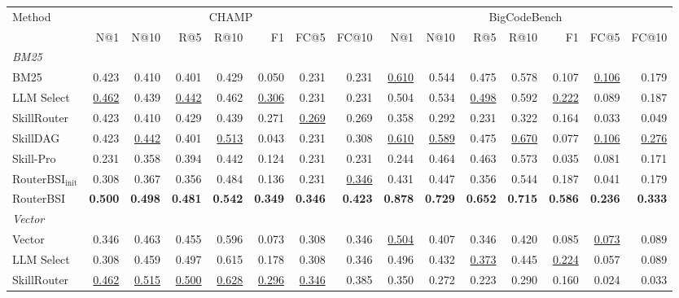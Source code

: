 \begin{table}[t]
\centering
\footnotesize
\setlength{\tabcolsep}{2pt}
\begin{tabular*}{\textwidth}{@{\extracolsep{\fill}}lrrrrrrrrrrrrrr@{}}
\toprule
Method & \multicolumn{7}{c}{CHAMP} & \multicolumn{7}{c}{BigCodeBench} \\
\cmidrule(lr){2-8}\cmidrule(lr){9-15}
 & N@1 & N@10 & R@5 & R@10 & F1 & FC@5 & FC@10 & N@1 & N@10 & R@5 & R@10 & F1 & FC@5 & FC@10 \\
\midrule
\multicolumn{15}{l}{\textit{BM25}} \\
\midrule
BM25 & 0.423 & 0.410 & 0.401 & 0.429 & 0.050 & 0.231 & 0.231 & \underline{0.610} & 0.544 & 0.475 & 0.578 & 0.107 & \underline{0.106} & 0.179 \\
LLM Select & \underline{0.462} & 0.439 & \underline{0.442} & 0.462 & \underline{0.306} & 0.231 & 0.231 & 0.504 & 0.534 & \underline{0.498} & 0.592 & \underline{0.222} & 0.089 & 0.187 \\
SkillRouter & 0.423 & 0.410 & 0.429 & 0.439 & 0.271 & \underline{0.269} & 0.269 & 0.358 & 0.292 & 0.231 & 0.322 & 0.164 & 0.033 & 0.049 \\
SkillDAG & 0.423 & \underline{0.442} & 0.401 & \underline{0.513} & 0.043 & 0.231 & 0.308 & \underline{0.610} & \underline{0.589} & 0.475 & \underline{0.670} & 0.077 & \underline{0.106} & \underline{0.276} \\
Skill-Pro & 0.231 & 0.358 & 0.394 & 0.442 & 0.124 & 0.231 & 0.231 & 0.244 & 0.464 & 0.463 & 0.573 & 0.035 & 0.081 & 0.171 \\
$\mathrm{RouterBSI}_{\mathrm{init}}$ & 0.308 & 0.367 & 0.356 & 0.484 & 0.136 & 0.231 & \underline{0.346} & 0.431 & 0.447 & 0.356 & 0.544 & 0.187 & 0.041 & 0.179 \\
RouterBSI & \textbf{0.500} & \textbf{0.498} & \textbf{0.481} & \textbf{0.542} & \textbf{0.349} & \textbf{0.346} & \textbf{0.423} & \textbf{0.878} & \textbf{0.729} & \textbf{0.652} & \textbf{0.715} & \textbf{0.586} & \textbf{0.236} & \textbf{0.333} \\
\midrule
\multicolumn{15}{l}{\textit{Vector}} \\
\midrule
Vector & 0.346 & 0.463 & 0.455 & 0.596 & 0.073 & 0.308 & 0.346 & \underline{0.504} & 0.407 & 0.346 & 0.420 & 0.085 & \underline{0.073} & 0.089 \\
LLM Select & 0.308 & 0.459 & 0.497 & 0.615 & 0.178 & 0.308 & 0.346 & 0.496 & 0.432 & \underline{0.373} & 0.445 & \underline{0.224} & 0.057 & 0.089 \\
SkillRouter & \underline{0.462} & \underline{0.515} & \underline{0.500} & \underline{0.628} & \underline{0.296} & \underline{0.346} & 0.385 & 0.350 & 0.272 & 0.223 & 0.290 & 0.160 & 0.024 & 0.033 \\

\end{tabular*}
\end{table}
